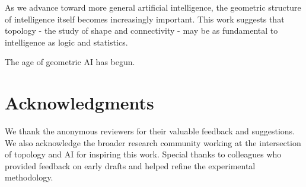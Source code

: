 \documentclass{article}
\begin{document}
As we advance toward more general artificial intelligence, the geometric structure of intelligence itself becomes increasingly important. This work suggests that topology - the study of shape and connectivity - may be as fundamental to intelligence as logic and statistics.

The age of geometric AI has begun.

\section*{Acknowledgments}

We thank the anonymous reviewers for their valuable feedback and suggestions. We also acknowledge the broader research community working at the intersection of topology and AI for inspiring this work. Special thanks to colleagues who provided feedback on early drafts and helped refine the experimental methodology.
\end{document}
